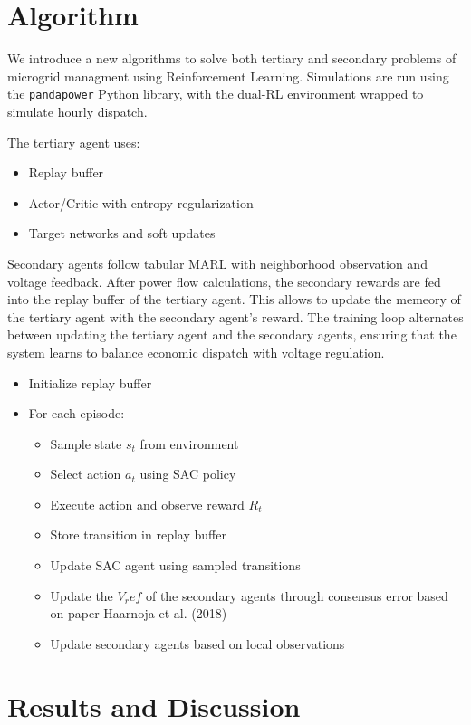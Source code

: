 \documentclass[11pt]{article}
\begin{document}
\section{Algorithm}
We introduce a new algorithms to solve both tertiary and secondary problems of microgrid managment using Reinforcement Learning. Simulations are run using the \texttt{pandapower} Python library, with the dual-RL environment wrapped to simulate hourly dispatch.

The tertiary agent uses:
\begin{itemize}
  \item Replay buffer
  \item Actor/Critic with entropy regularization
  \item Target networks and soft updates
\end{itemize}

Secondary agents follow tabular MARL with neighborhood observation and voltage feedback. After power flow calculations, the secondary rewards are fed into the replay buffer of the tertiary agent. This allows to update the memeory of the tertiary agent with the secondary agent's reward.
The training loop alternates between updating the tertiary agent and the secondary agents, ensuring that the system learns to balance economic dispatch with voltage regulation.
\begin{itemize}
  \item Initialize replay buffer
  \item For each episode:
    \begin{itemize}
      \item Sample state $s_t$ from environment
      \item Select action $a_t$ using SAC policy
      \item Execute action and observe reward $R_t$
      \item Store transition in replay buffer
      \item Update SAC agent using sampled transitions
      \item Update the $V_ref$ of the secondary agents through consensus error based on paper Haarnoja et al. (2018)
      \item Update secondary agents based on local observations
    \end{itemize}
\end{itemize}

\section{Results and Discussion}
\end{document}
